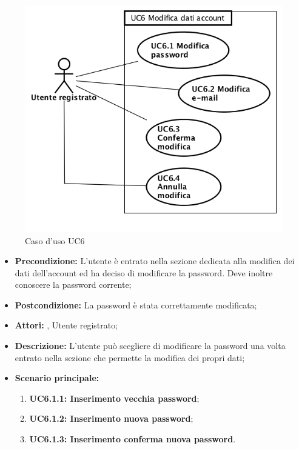 \begin{figure}[h]
	\begin{center}
	\includegraphics[scale=0.4]{diagram/UC6.png}
	\caption{Caso d'uso UC6}
	\end{center}
\end{figure}
\begin{itemize}
	\item \textbf{Precondizione:} L’utente è entrato nella sezione dedicata alla modifica dei dati dell’account ed ha deciso di modificare la password. Deve inoltre conoscere la password corrente;
	\item \textbf{Postcondizione:} La password è stata correttamente modificata;
	\item \textbf{Attori:} , Utente registrato;
	\item \textbf{Descrizione:} L’utente può scegliere di modificare la password una volta entrato nella sezione che permette la modifica dei propri dati;
	\item \textbf{Scenario principale:}
	\begin{enumerate}
		\item \textbf{ UC6.1.1: Inserimento vecchia password};
		\item \textbf{ UC6.1.2: Inserimento nuova password};
		\item \textbf{ UC6.1.3: Inserimento conferma nuova password}.
	\end{enumerate}
\end{itemize}
